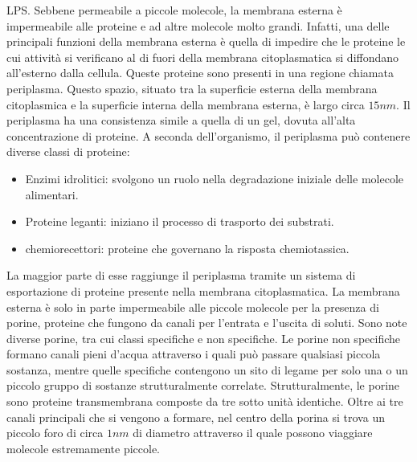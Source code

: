LPS. Sebbene permeabile a piccole molecole, la membrana esterna è impermeabile alle proteine e ad altre molecole molto grandi. Infatti, una delle principali 
funzioni della membrana esterna è quella di impedire che le proteine le cui attività si verificano al di fuori della membrana citoplasmatica si diffondano 
all’esterno dalla cellula. Queste proteine sono presenti in una regione chiamata periplasma. Questo spazio, situato tra la superficie esterna della membrana 
citoplasmica e la superficie interna della membrana esterna, è largo circa $15nm$. Il periplasma ha una consistenza simile a quella di un gel, dovuta 
all’alta concentrazione di proteine. A seconda dell'organismo, il periplasma può contenere diverse classi di proteine:
\begin{itemize}
	\item Enzimi idrolitici: svolgono un ruolo nella degradazione iniziale delle molecole alimentari.
	\item Proteine leganti: iniziano il processo di trasporto dei substrati.
	\item chemiorecettori: proteine che governano la risposta chemiotassica.
\end{itemize}
La maggior parte di esse raggiunge il periplasma tramite un sistema di esportazione di proteine presente nella membrana citoplasmatica. La membrana esterna è solo in parte impermeabile alle piccole molecole per la presenza di 
 porine, proteine che fungono da canali per l’entrata e l’uscita di soluti. Sono note diverse porine, tra cui classi specifiche e non specifiche. Le 
porine non specifiche formano canali pieni d'acqua attraverso i quali può passare qualsiasi piccola sostanza, mentre quelle specifiche contengono un 
sito di legame per solo una o un piccolo gruppo di sostanze strutturalmente correlate. Strutturalmente, le porine sono proteine transmembrana composte da 
tre sotto unità identiche. Oltre ai tre canali principali che si vengono a formare, nel centro della porina si trova un piccolo foro di circa $1nm$ di 
diametro attraverso il quale possono viaggiare molecole estremamente piccole. 
